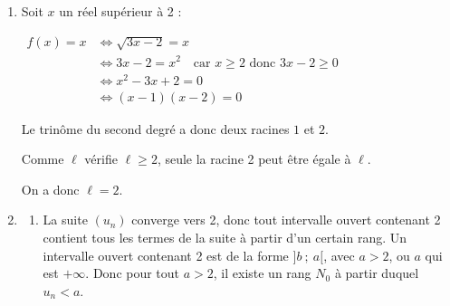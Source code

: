 \documentclass[10pt]{article}
\providecommand{\N}{\mathbb{N}}
\begin{document}
\begin{enumerate}
\begin{enumerate}
			En effectuant les calculs :\quad $2 \leqslant u_{n+2} \leqslant u_{n+1}\leqslant 4$.

			Enfin, comme $4 \leqslant 6$, ce qui précède implique :\quad $2 \leqslant u_{n+2} \leqslant u_{n+1}\leqslant 6$.

			Si l'inégalité est vraie pour un entier naturel $n$ donné, alors on prouve qu'elle est aussi vraie pour l'indice suivant, $n+1$.

			\emph{Conclusion :} L'inégalité est vraie pour l'indice $n=0$, et pour tout $n$ entier naturel, elle est héréditaire. Par application du principe de récurrence, on peut affirmer que, pour tout $n$ entier naturel, on a :\quad $2 \leqslant u_{n+1} \leqslant u_{n}\leqslant 6$.

			\item De la question précédente on tire :
			\begin{itemize}
				\item $\forall n \in \N,\quad u_{n+1} \leqslant u_n$:\quad la suite $(u_n)$ est décroissante;
				\item $\forall n \in \N,\quad 2 \leqslant u_n$:\quad la suite $(u_n)$ est minorée par 2;
			\end{itemize}
			$(u_n)$ est décroissante et minorée par 2, donc elle converge vers une limite $\ell$ qui vérifie :\quad $2 \leqslant \ell$.
		\end{enumerate}

		\item Soit $x$ un réel supérieur à 2 :

		$\begin{aligned}
			f(x) = x &\iff \sqrt{3x-2} = x \\
			&\iff 3x - 2 = x^2\quad \text{car $x \geqslant 2$ donc } 3x - 2 \geqslant 0\\
			&\iff x^2 - 3x + 2 = 0\\
			&\iff (x-1)(x-2) = 0
		\end{aligned}$

		Le trinôme du second degré a donc deux racines $1$ et $2$.

		Comme $\ell$ vérifie $\ell \geqslant 2$, seule la racine 2 peut être égale à $\ell$.

		On a donc $\ell = 2$.

		\item
		\begin{enumerate}
			\item La suite $(u_n)$ converge vers 2, donc tout intervalle ouvert contenant 2 contient tous les termes de la suite à partir d'un certain rang. Un intervalle ouvert contenant 2 est de la forme $]b ~;~ a[$, avec $a > 2$, ou $a$ qui est $+\infty$. Donc pour tout $a > 2$, il existe un rang $N_0$ à partir duquel $u_n < a$.


\end{enumerate}
\end{enumerate}
\end{document}
